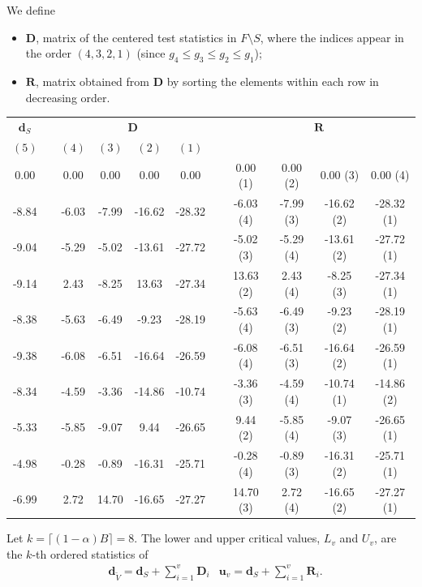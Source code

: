 \documentclass[11pt,a4paper,openright,twoside]{article}
\begin{document}
We define
\begin{itemize}
\item $\mathbf{D}$, matrix of the centered test statistics in $F\setminus S$, where the indices appear in the order $(4,3,2,1)$ (since $g_4\leq g_3\leq g_2\leq g_1$);
\item $\mathbf{R}$, matrix obtained from $\mathbf{D}$ by sorting the elements within each row in decreasing order.
\end{itemize}

\newpage
\begin{table}[h!]
\centering
\begin{tabular}{ccccccccccc}
$\mathbf{d}_S$ & & \multicolumn{4}{c}{$\mathbf{D}$} & & \multicolumn{4}{c}{$\mathbf{R}$}\\
$(5)$ &  & $(4)$ & $(3)$ & $(2)$ & $(1)$ &  &  &  &  &  \\
\cline{1-1} \cline{3-6} \cline{8-11}
0.00 &  & 0.00 & 0.00 & 0.00 & 0.00 &  & 0.00 (1)& 0.00 (2)& 0.00 (3)& 0.00 (4)\\
-8.84 &  & -6.03 & -7.99 & -16.62 & -28.32 &  & -6.03 (4)& -7.99 (3)& -16.62 (2)& -28.32 (1)\\
-9.04 &  & -5.29 & -5.02 & -13.61 & -27.72 &  & -5.02 (3)& -5.29 (4)& -13.61 (2)& -27.72 (1)\\
-9.14 &  & 2.43 & -8.25 & 13.63 & -27.34 &  & 13.63 (2)& 2.43 (4)& -8.25 (3)& -27.34 (1)\\
-8.38 &  & -5.63 & -6.49 & -9.23 & -28.19 &  & -5.63 (4)& -6.49 (3)& -9.23 (2)& -28.19 (1)\\
-9.38 &  & -6.08 & -6.51 & -16.64 & -26.59 &  & -6.08 (4)& -6.51 (3)& -16.64 (2)& -26.59 (1)\\
-8.34 &  & -4.59 & -3.36 & -14.86 & -10.74 &  & -3.36 (3)& -4.59 (4)& -10.74 (1)& -14.86 (2)\\
-5.33 &  & -5.85 & -9.07 & 9.44 & -26.65 &  & 9.44 (2)& -5.85 (4)& -9.07 (3)& -26.65 (1)\\
-4.98 &  & -0.28 & -0.89 & -16.31 & -25.71 &  & -0.28 (4)& -0.89 (3)& -16.31 (2)& -25.71 (1)\\
-6.99 &  & 2.72 & 14.70 & -16.65 & -27.27 &  & 14.70 (3)& 2.72 (4)& -16.65 (2) & -27.27 (1)
\end{tabular}
\end{table}

Let $k=\lceil (1-\alpha) B\rceil =8$. The lower and upper critical values, $L_v$ and $U_v$, are the $k$-th ordered statistics of
\begin{align*}
& \mathbf{d}_{\tilde{V}}=\mathbf{d}_S + \sum_{i=1}^v \mathbf{D}_i & \mathbf{u}_v=\mathbf{d}_S + \sum_{i=1}^v \mathbf{R}_i.
\end{align*}
\end{document}
